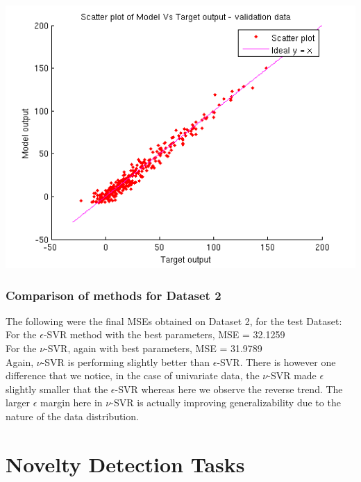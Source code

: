 \documentclass{article}
\begin{document}
\begin{center}
\includegraphics[scale=.6]{Regression/bivar/nu/scatter_val}
\end{center}

\subsubsection{Comparison of methods for Dataset 2}
The following were the final MSEs obtained on Dataset 2, for the test Dataset: \\[5pt]
For the $\epsilon$-SVR method with the best parameters, MSE = 32.1259 \\
For the $\nu$-SVR, again with best parameters, MSE = 31.9789 \\[5pt]
Again, $\nu$-SVR is performing slightly better than $\epsilon$-SVR. There is however one difference that we notice, in the case of univariate data, the $\nu$-SVR made $\epsilon$ slightly smaller that the $\epsilon$-SVR whereas here we observe the reverse trend. The larger $\epsilon$ margin here in $\nu$-SVR is actually improving generalizability due to the nature of the data distribution.

















\section{Novelty Detection Tasks}
\end{document}
